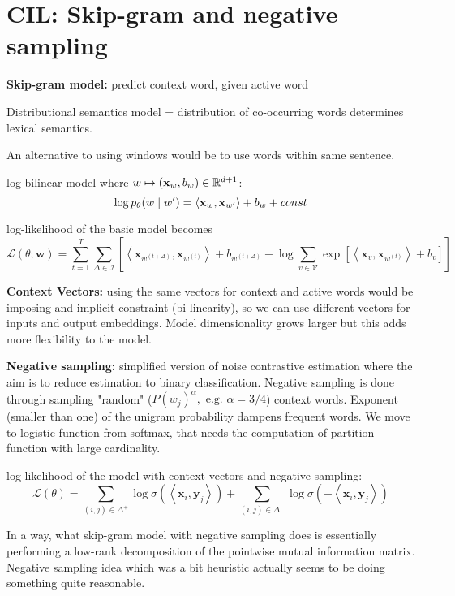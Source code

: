 \documentclass[12pt]{article}
\begin{document}
\section{CIL: Skip-gram and negative sampling}
\ulb
\item \textbf{Skip-gram model:} predict context word, given active word
\item Distributional semantics model = distribution of co-occurring words determines lexical semantics.
\item An alternative to using windows would be to use words within same sentence.
\item log-bilinear model where $w \mapsto (\mathbf{x}_w, b_w)\in\mathbb{R}^{d+1}$:
\[ \log p_{\theta}(w\mid w') = \left\langle \mathbf{x}_w, \mathbf{x}_{w'} \right\rangle + b_w + const \]
\item log-likelihood of the basic model becomes
\[ \mathcal{L}(\theta;\mathbf{w}) = \sum_{t=1}^T \sum_{\Delta\in\mathcal{I}} \left[
\left\langle \mathbf{x}_{w^{(t+\Delta)}}, \mathbf{x}_{w^{(t)}} \right\rangle + b_{w^{(t+\Delta)}}
-\log \sum_{v\in\mathcal{V}} \exp\left[ \left\langle \mathbf{x}_{v}, \mathbf{x}_{w^{(t)}} \right\rangle + b_{v} \right]
\right] \]
\item \textbf{Context Vectors:} using the same vectors for context and active words would be imposing and implicit constraint (bi-linearity), so we can use different vectors for inputs and output embeddings. Model dimensionality grows larger but this adds more flexibility to the model.
\item \textbf{Negative sampling:} simplified version of noise contrastive estimation where the aim is to reduce estimation to binary classification. Negative sampling is done through sampling "random" ($P(w_j)^{\alpha}, \text{ e.g. } \alpha=3/4$) context words. Exponent (smaller than one) of the unigram probability dampens frequent words. We move to logistic function from softmax, that needs the computation of partition function with large cardinality.
\item log-likelihood of the model with context vectors and negative sampling:
\[ \mathcal{L}(\theta) = \sum_{(i,j)\in\Delta^+} \log\sigma\left(\left\langle \mathbf{x}_i,\mathbf{y}_j \right\rangle\right) + \sum_{(i,j)\in\Delta^-} \log\sigma\left(-\left\langle \mathbf{x}_i,\mathbf{y}_j \right\rangle\right) \]
\item In a way, what skip-gram model with negative sampling does is essentially performing a low-rank decomposition of the pointwise mutual information matrix. Negative sampling idea which was a bit heuristic actually seems to be doing something quite reasonable.
\ule
\end{document}
